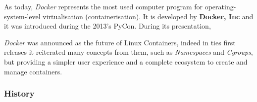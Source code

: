\documentclass[a4paper,12pt]{article}
\begin{document}
As today, \textit{Docker} represents the most used computer program for
operating-system-level virtualisation (containerisation). It is developed by
\textbf{Docker, Inc}\cite{docker_official_site} and it was introduced during the
2013's PyCon. During its presentation, \par\textit{Docker} was announced as the
future of Linux Containers\cite{docker_pycon_presentation}, indeed in ties first
releases it reiterated many concepts from them, such as \textit{Namespaces} and
\textit{Cgroups}, but providing a simpler user experience and a complete
ecosystem to create and manage containers.

\subsubsection{History}
\end{document}

